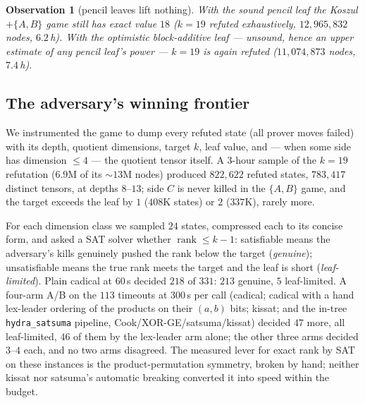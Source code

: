 \documentclass[11pt]{article}
\newtheorem{observation}{Observation}
\theoremstyle{definition}
\newcommand{\rk}{\operatorname{rank}}
\begin{document}
\begin{observation}[pencil leaves lift nothing]
With the sound pencil leaf the Koszul$+\{A,B\}$ game still has exact value
$18$ ($k=19$ refuted exhaustively, $12{,}965{,}832$ nodes, $6.2$\,h). With the
optimistic block-additive leaf --- unsound, hence an upper estimate of any
pencil leaf's power --- $k=19$ is again refuted ($11{,}074{,}873$ nodes,
$7.4$\,h).
\end{observation}

\subsection{The adversary's winning frontier}

We instrumented the game to dump every refuted state (all prover moves
failed) with its depth, quotient dimensions, target $k$, leaf value, and
--- when some side has dimension $\le 4$ --- the quotient tensor itself. A
$3$-hour sample of the $k=19$ refutation ($6.9$M of its $\sim$$13$M nodes)
produced $822{,}622$ refuted states, $783{,}417$ distinct tensors, at depths
$8$--$13$; side $C$ is never killed in the $\{A,B\}$ game, and the target
exceeds the leaf by $1$ ($408$K states) or $2$ ($337$K), rarely more.

For each dimension class we sampled $24$ states, compressed each to its
concise form, and asked a SAT solver whether $\rk \le k-1$: satisfiable means
the adversary's kills genuinely pushed the rank below the target
(\emph{genuine}); unsatisfiable means the true rank meets the target and the
leaf is short (\emph{leaf-limited}). Plain cadical at $60$\,s decided $218$
of $331$: $213$ genuine, $5$ leaf-limited. A four-arm A/B on the $113$
timeouts at $300$\,s per call (cadical; cadical with a hand lex-leader
ordering of the products on their $(a,b)$ bits; kissat; and the in-tree
\texttt{hydra\_satsuma} pipeline, Cook/XOR-GE/satsuma/kissat) decided $47$
more, all leaf-limited, $46$ of them by the lex-leader arm alone; the other
three arms decided $3$--$4$ each, and no two arms disagreed. The measured
lever for exact rank by SAT on these instances is the product-permutation
symmetry, broken by hand; neither kissat nor satsuma's automatic breaking
converted it into speed within the budget.
\end{document}

